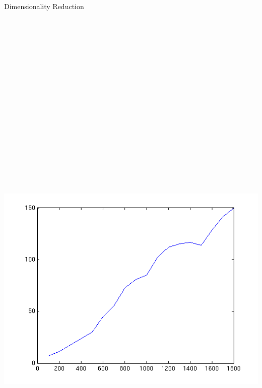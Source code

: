 \documentclass[final,t]{beamer}
\begin{document}
\begin{frame}{}
\begin{columns}[t]
\begin{column}{.3\linewidth}
\begin{block}{Dimensionality Reduction}
\includegraphics[width=0.8\linewidth,height=40cm]{images/dim_vs_runningtime.png}
       

\end{block}
\end{column}
\end{columns}
\end{frame}
\end{document}

